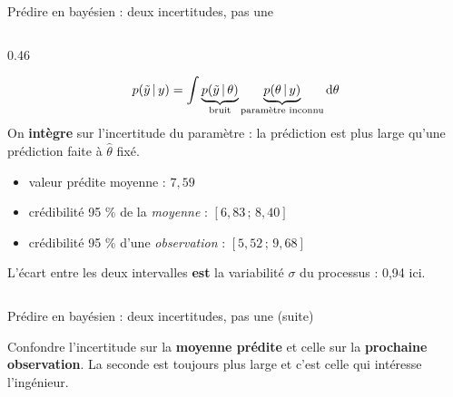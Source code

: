 \begin{frame}{Prédire en bayésien : deux incertitudes, pas une}
\begin{columns}[t]
\begin{column}{0.46\textwidth}
\begin{kbox}
\[
p(\tilde y \,\vert\, y) = \int \underbrace{p(\tilde y \,\vert\, \theta)}_{\text{bruit}}
\underbrace{p(\theta \,\vert\, y)}_{\text{paramètre inconnu}} \mathrm{d}\theta
\]
On \textbf{intègre} sur l'incertitude du paramètre : la prédiction est
plus large qu'une prédiction faite à $\hat\theta$ fixé.
\end{kbox}
\begin{ebox}[Chiffres réels à $x = 8$]
\begin{itemize}
  \item valeur prédite moyenne : $7{,}59$
  \item crédibilité 95 \% de la \emph{moyenne} : $[6{,}83 \,;\, 8{,}40]$
  \item crédibilité 95 \% d'une \emph{observation} : $[5{,}52 \,;\, 9{,}68]$
\end{itemize}
\vspace{1mm}
\small L'écart entre les deux intervalles \textbf{est} la variabilité
$\sigma$ du processus : 0,94 ici.
\end{ebox}
\end{column}
\end{columns}
\end{frame}

\begin{frame}{Prédire en bayésien : deux incertitudes, pas une (suite)}
\begin{wbox}
Confondre l'incertitude sur la \textbf{moyenne prédite} et celle sur la
\textbf{prochaine observation}. La seconde est toujours plus large et
c'est celle qui intéresse l'ingénieur.
\end{wbox}
\end{frame}

